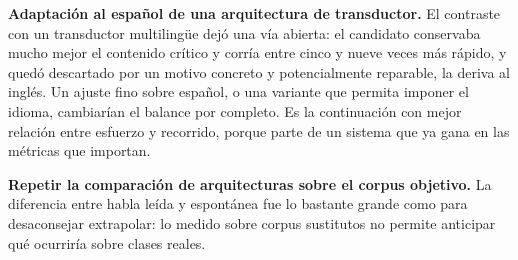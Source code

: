 \textbf{Adaptación al español de una arquitectura de transductor.} El contraste con un
transductor multilingüe dejó una vía abierta: el candidato conservaba mucho mejor el
contenido crítico y corría entre cinco y nueve veces más rápido, y quedó descartado por un
motivo concreto y potencialmente reparable, la deriva al inglés. Un ajuste fino sobre
español, o una variante que permita imponer el idioma, cambiarían el balance por completo.
Es la continuación con mejor relación entre esfuerzo y recorrido, porque parte de un
sistema que ya gana en las métricas que importan.

\textbf{Repetir la comparación de arquitecturas sobre el corpus objetivo.} La diferencia
entre habla leída y espontánea fue lo bastante grande como para desaconsejar extrapolar: lo
medido sobre corpus sustitutos no permite anticipar qué ocurriría sobre clases reales.
